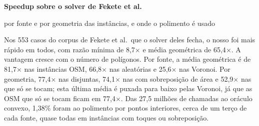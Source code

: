 \documentclass[11pt]{article}
\newcommand{\vez}{\ensuremath{\times}}
\begin{document}
{\color{navy}\LARGE\bfseries Speedup sobre o solver de Fekete et al.\par}
\vspace{2pt}
{\color{quiet}\large por fonte e por geometria das instâncias, e onde o polimento é usado\par}
\vspace{10pt}

\begin{tcolorbox}[colback=navy!4,colframe=navy!35,boxrule=.5pt,arc=2pt,left=8pt,right=8pt,top=5pt,bottom=5pt]
\small Nos 553 casos do corpus de Fekete et al.\ que o solver deles fecha, o nosso foi mais rápido em todos, com razão mínima de 8,7\vez{} e média geométrica de 65,4\vez. A vantagem cresce com o número de polígonos. Por fonte, a média geométrica é de 81,7\vez{} nas instâncias OSM, 66,8\vez{} nas aleatórias e 25,6\vez{} nas Voronoi. Por geometria, 77,4\vez{} nas disjuntas, 74,1\vez{} nas com sobreposição de área e 52,9\vez{} nas que só se tocam; esta última média é puxada para baixo pelas Voronoi, já que as OSM que só se tocam ficam em 77,4\vez. Das 27,5 milhões de chamadas ao oráculo convexo, 1,38\% foram ao polimento por pontos interiores, cerca de um terço de cada fonte, quase todas em instâncias com toques ou sobreposição.
\end{tcolorbox}
\end{document}
